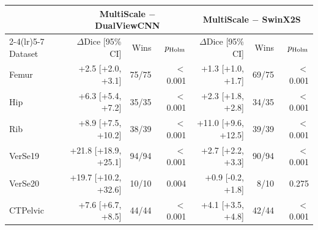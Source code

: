 \begin{tabular}{lrrrrrr}
\toprule
& \multicolumn{3}{c}{MultiScale $-$ DualViewCNN} & \multicolumn{3}{c}{MultiScale $-$ SwinX2S} \\ \cmidrule(lr){2-4}\cmidrule(lr){5-7} Dataset & $\Delta$Dice [95\% CI] & Wins & $p_{\rm Holm}$ & $\Delta$Dice [95\% CI] & Wins & $p_{\rm Holm}$ \\
\midrule
Femur & +2.5 [+2.0, +3.1] & 75/75 & $<$0.001 & +1.3 [+1.0, +1.7] & 69/75 & $<$0.001 \\
Hip & +6.3 [+5.4, +7.2] & 35/35 & $<$0.001 & +2.3 [+1.8, +2.8] & 34/35 & $<$0.001 \\
Rib & +8.9 [+7.5, +10.2] & 38/39 & $<$0.001 & +11.0 [+9.6, +12.5] & 39/39 & $<$0.001 \\
VerSe19 & +21.8 [+18.9, +25.1] & 94/94 & $<$0.001 & +2.7 [+2.2, +3.3] & 90/94 & $<$0.001 \\
VerSe20 & +19.7 [+10.2, +32.6] & 10/10 & 0.004 & +0.9 [-0.2, +1.8] & 8/10 & 0.275 \\
CTPelvic & +7.6 [+6.7, +8.5] & 44/44 & $<$0.001 & +4.1 [+3.5, +4.8] & 42/44 & $<$0.001 \\
\bottomrule
\end{tabular}
